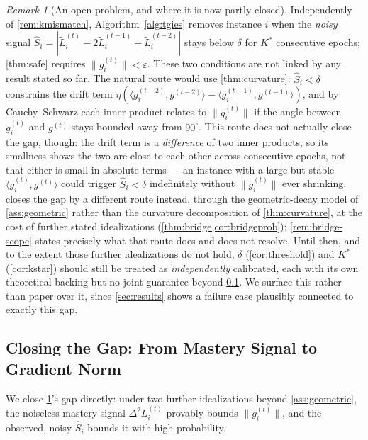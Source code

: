 \documentclass{article}
\theoremstyle{plain}
\theoremstyle{definition}
\theoremstyle{remark}
\newtheorem{remark}[theorem]{Remark}
\begin{document}
\begin{remark}[An open problem, and where it is now partly closed]
\label{rem:open}
Independently of \cref{rem:kmismatch}, Algorithm~\ref{alg:tgies} removes instance $i$ when the \emph{noisy} signal $\hat S_i = |\tilde L_i^{(t)}-2\tilde L_i^{(t-1)}+\tilde L_i^{(t-2)}|$ stays below $\delta$ for $K^*$ consecutive epochs; \cref{thm:safe} requires $\|g_i^{(t)}\|<\varepsilon$. These two conditions are not linked by any result stated so far. The natural route would use \cref{thm:curvature}: $\hat S_i<\delta$ constrains the drift term $\eta(\langle g_i^{(t-2)},g^{(t-2)}\rangle-\langle g_i^{(t-1)},g^{(t-1)}\rangle)$, and by Cauchy--Schwarz each inner product relates to $\|g_i^{(t)}\|$ if the angle between $g_i^{(t)}$ and $g^{(t)}$ stays bounded away from $90^\circ$. This route does not actually close the gap, though: the drift term is a \emph{difference} of two inner products, so its smallness shows the two are close to each other across consecutive epochs, not that either is small in absolute terms — an instance with a large but stable $\langle g_i^{(t)},g^{(t)}\rangle$ could trigger $\hat S_i<\delta$ indefinitely without $\|g_i^{(t)}\|$ ever shrinking.  closes the gap by a different route instead, through the geometric-decay model of \cref{ass:geometric} rather than the curvature decomposition of \cref{thm:curvature}, at the cost of further stated idealizations (\cref{thm:bridge,cor:bridgeprob}); \cref{rem:bridge-scope} states precisely what that route does and does not resolve. Until then, and to the extent those further idealizations do not hold, $\delta$ (\cref{cor:threshold}) and $K^*$ (\cref{cor:kstar}) should still be treated as \emph{independently} calibrated, each with its own theoretical backing but no joint guarantee beyond \cref{sec:bridge}. We surface this rather than paper over it, since \cref{sec:results} shows a failure case plausibly connected to exactly this gap.
\end{remark}

\subsection{Closing the Gap: From Mastery Signal to Gradient Norm}
\label{sec:bridge}

We close \cref{rem:open}'s gap directly: under two further idealizations beyond \cref{ass:geometric}, the noiseless mastery signal $\Delta^2 L_i^{(t)}$ provably bounds $\|g_i^{(t)}\|$, and the observed, noisy $\hat S_i$ bounds it with high probability.
\end{document}
